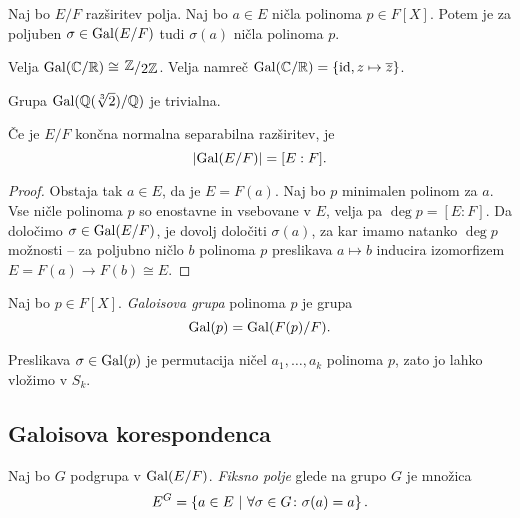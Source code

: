 \begin{lema}
Naj bo $E/F$ razširitev polja. Naj bo $a \in E$ ničla polinoma
$p \in F[X]$. Potem je za poljuben $\sigma \in \operatorname{Gal}(E/F)$ tudi
$\sigma(a)$ ničla polinoma $p$.
\end{lema}

\obvs

\begin{zgled}
Velja $\Gal(\C/\R) \cong \kvoc{\Z}{2\Z}$. Velja namreč
$\operatorname{Gal}(\mathbb{C}/\mathbb{R}) = \left\{\operatorname{id}, z \mapsto \overline{z}\right\}$.
\end{zgled}

\begin{zgled}
Grupa $\operatorname{Gal}(\mathbb{Q}(\sqrt[3]{2})/\mathbb{Q})$ je trivialna.
\end{zgled}

\begin{trditev}
Če je $E/F$ končna normalna separabilna razširitev, je
\[
\left\lvert \operatorname{Gal}(E/F)\right\rvert = [E : F].
\]
\end{trditev}

\begin{proof}
Obstaja tak $a \in E$, da je $E = F(a)$. Naj bo $p$ minimalen
polinom za $a$. Vse ničle polinoma $p$ so enostavne in vsebovane v
$E$, velja pa $\deg p = [E : F]$. Da določimo
$\sigma \in \operatorname{Gal}(E/F)$, je dovolj določiti $\sigma(a)$, za
kar imamo natanko $\deg p$ možnosti -- za poljubno ničlo $b$
polinoma $p$ preslikava $a \mapsto b$ inducira izomorfizem
$E = F(a) \to F(b) \cong E$.
\end{proof}

\begin{definicija}
Naj bo $p \in F[X]$.
\emph{Galoisova grupa} polinoma $p$ je
grupa
\[
\operatorname{Gal}(p) = \operatorname{Gal}(F(p)/F).
\]
\end{definicija}

\begin{opomba}
Preslikava $\sigma \in \operatorname{Gal}(p)$ je permutacija ničel
$a_1, \dots, a_k$ polinoma $p$, zato jo lahko vložimo v $S_k$.
\end{opomba}

\newpage

\subsection{Galoisova korespondenca}

\begin{definicija}
Naj bo $G$ podgrupa v $\operatorname{Gal}(E/F)$.
\emph{Fiksno polje} glede na grupo $G$ je
množica
\[
E^G = \left\{a \in E~\middle\vert~\forall \sigma \in G \colon \sigma(a) = a\right\}.
\]
\end{definicija}

